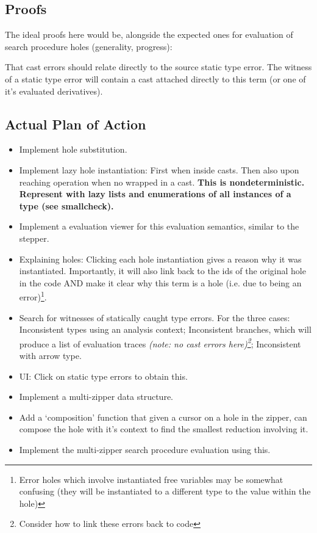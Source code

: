 \subsection{Proofs}
The ideal proofs here would be, alongside the expected ones for evaluation of search procedure holes (generality, progress):\par 
That cast errors should relate directly to the source static type error. The witness of a static type error will contain a cast attached directly to this term (or one of it's evaluated derivatives).

\subsection{Actual Plan of Action}
\begin{itemize}
\item Implement hole substitution.
\item Implement lazy hole instantiation: First when inside casts. Then also upon reaching operation when no wrapped in a cast. \textbf{This is nondeterministic. Represent with lazy lists and enumerations of all instances of a type (see smallcheck).} 
\item Implement a evaluation viewer for this evaluation semantics, similar to the stepper.
\item Explaining holes: Clicking each hole instantiation gives a reason why it was instantiated. Importantly, it will also link back to the ids of the original hole in the code AND make it clear why this term is a hole (i.e. due to being an error)\footnote{Error holes which involve instantiated free variables may be somewhat confusing (they will be instantiated to a different type to the value within the hole)}.
\item Search for witnesses of statically caught type errors. For the three cases: Inconsistent types using an analysis context; Inconsistent branches, which will produce a list of evaluation traces \textit{(note: no cast errors here)\footnote{Consider how to link these errors back to code}}; Inconsistent with arrow type.
\item UI: Click on static type errors to obtain this.
\item Implement a multi-zipper data structure. \cite{MultiZipper}
\item Add a `composition' function that given a cursor on a hole in the zipper, can compose the hole with it's context to find the smallest reduction involving it.
\item Implement the multi-zipper search procedure evaluation using this.
\end{itemize}